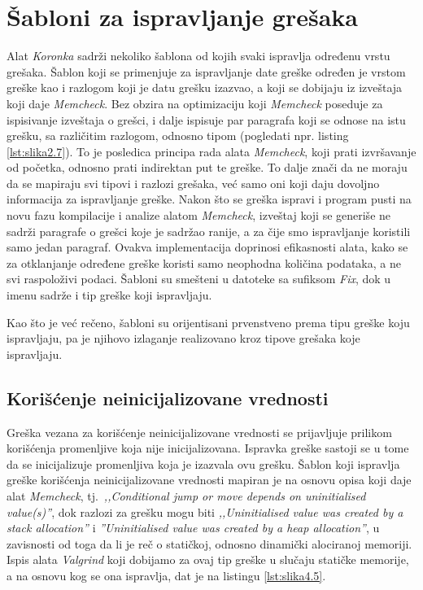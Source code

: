 \documentclass[12pt,oneside]{memoir}
\theoremstyle{plain}
\theoremstyle{definition}
\begin{document}
\section{Šabloni za ispravljanje grešaka}
Alat \textit{Koronka} sadrži nekoliko šablona od kojih svaki ispravlja određenu vrstu grešaka. Šablon koji se primenjuje za ispravljanje date greške određen je vrstom greške kao i razlogom koji je datu grešku izazvao, a koji se dobijaju iz izveštaja koji daje \textit{Memcheck}. Bez obzira na optimizaciju koji \textit{Memcheck} poseduje za ispisivanje izveštaja o grešci, i dalje ispisuje par paragrafa koji se odnose na istu grešku, sa različitim razlogom, odnosno tipom (pogledati npr. listing \ref{lst:slika2.7}). To je posledica principa rada alata \textit{Memcheck}, koji prati izvršavanje od početka, odnosno prati indirektan put te greške. To dalje znači da ne moraju da se mapiraju svi tipovi i razlozi grešaka, već samo oni koji daju dovoljno informacija za ispravljanje greške. Nakon što se greška ispravi i program pusti na novu fazu kompilacije i analize alatom \textit{Memcheck}, izveštaj koji se generiše ne sadrži paragrafe o grešci koje je sadržao ranije, a za čije smo ispravljanje koristili samo jedan paragraf. Ovakva implementacija doprinosi efikasnosti alata, kako se za otklanjanje određene greške koristi samo neophodna količina podataka, a ne svi raspoloživi podaci. Šabloni su smešteni u datoteke sa sufiksom \textit{Fix}, dok u imenu sadrže i tip greške koji ispravljaju. 

Kao što je već rečeno, šabloni su orijentisani prvenstveno prema tipu greške koju ispravljaju, pa je njihovo izlaganje realizovano kroz tipove grešaka koje ispravljaju. 

\subsection{Korišćenje neinicijalizovane vrednosti}
Greška vezana za korišćenje neinicijalizovane vrednosti se prijavljuje prilikom korišćenja promenljive koja nije inicijalizovana. Ispravka greške sastoji se u tome da se inicijalizuje promenljiva koja je izazvala ovu grešku. Šablon koji ispravlja greške korišćenja neinicijalizovane vrednosti mapiran je na osnovu opisa koji daje alat \textit{Memcheck}, tj.~\textit{,,Conditional jump or move depends on uninitialised value(s)''}, dok razlozi za grešku mogu biti \textit{,,Uninitialised value was created by a stack allocation''} i \textit{''Uninitialised value was created by a heap allocation''}, u zavisnosti od toga da li je reč o statičkoj, odnosno dinamički alociranoj memoriji. Ispis alata \textit{Valgrind} koji dobijamo za ovaj tip greške u slučaju statičke memorije, a na osnovu kog se ona ispravlja, dat je na listingu \ref{lst:slika4.5}.
\end{document}
